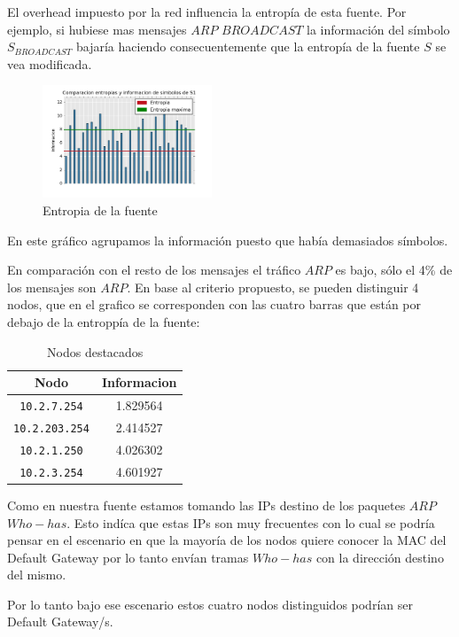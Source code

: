 El overhead impuesto por la red influencia la entropía de esta fuente.
Por ejemplo, si hubiese mas mensajes $ARP$ $BROADCAST$ la información del símbolo $S_{BROADCAST}$ bajaría haciendo consecuentemente que la entropía de la fuente $S$ se vea modificada.

\begin{figure}[h]
  \centering
    \includegraphics[width=0.45\textwidth]{grafico2-red-labos.png}
  \caption{Entropia de la fuente}
  \label{entropia-s1}
\end{figure}
En este gráfico agrupamos la información puesto que había demasiados símbolos.

En comparación con el resto de los mensajes el tráfico $ARP$ es bajo, sólo el 4\% de los mensajes son $ARP$. En base al criterio propuesto, se pueden distinguir 4 nodos, que en el grafico se corresponden con las cuatro barras que están por debajo de la entroppía de la fuente:   

    \begin{table}[ht]\begin{center}
      \begin{tabular}{|c|c|}
      \hline
      \textbf{Nodo} & \textbf{Informacion} \\ \hline
      \texttt{10.2.7.254}& 1.829564 \\ \hline
      \texttt{10.2.203.254}& 2.414527 \\ \hline
      \texttt{10.2.1.250}& 4.026302 \\ \hline
      \texttt{10.2.3.254}& 4.601927 \\ \hline
      \end{tabular}
      \caption{Nodos destacados}
      \label{Nodos-destacados}
    \end{center}\end{table}

Como en nuestra fuente estamos tomando las IPs destino de los paquetes $ARP$ $Who-has$. Esto indíca que estas IPs son muy frecuentes con lo cual se podría pensar en el escenario en que la mayoría de los nodos quiere conocer la MAC del Default Gateway por lo tanto envían tramas $Who-has$ con la dirección destino del mismo.

Por lo tanto bajo ese escenario estos cuatro nodos distinguidos podrían ser Default Gateway/s. 
